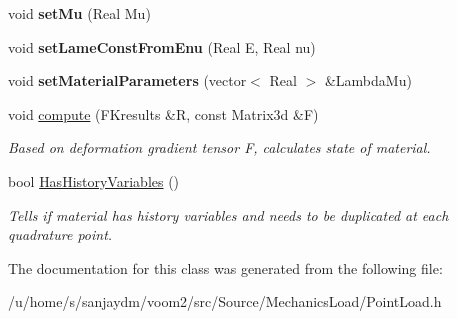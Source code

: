 \begin{DoxyCompactItemize}
\item 
\hypertarget{classvoom_1_1_point_load_a7dd8de114919a5428ed5692b149ee40a}{
void {\bfseries setMu} (Real Mu)}
\label{classvoom_1_1_point_load_a7dd8de114919a5428ed5692b149ee40a}

\item 
\hypertarget{classvoom_1_1_point_load_a85890bff5831fb2db22f6b271b8b4f1b}{
void {\bfseries setLameConstFromEnu} (Real E, Real nu)}
\label{classvoom_1_1_point_load_a85890bff5831fb2db22f6b271b8b4f1b}

\item 
\hypertarget{classvoom_1_1_point_load_a5718133ac6b9516e4050f20bf7352497}{
void {\bfseries setMaterialParameters} (vector$<$ Real $>$ \&LambdaMu)}
\label{classvoom_1_1_point_load_a5718133ac6b9516e4050f20bf7352497}

\item 
\hypertarget{classvoom_1_1_point_load_a0fc8a93dd23d399b06f4f58df3a69fe0}{
void \hyperlink{classvoom_1_1_point_load_a0fc8a93dd23d399b06f4f58df3a69fe0}{compute} (FKresults \&R, const Matrix3d \&F)}
\label{classvoom_1_1_point_load_a0fc8a93dd23d399b06f4f58df3a69fe0}

\begin{DoxyCompactList}\small\item\em Based on deformation gradient tensor F, calculates state of material. \item\end{DoxyCompactList}\item 
\hypertarget{classvoom_1_1_point_load_aec5de28848938c0e6ffcb86aaa9c6b3b}{
bool \hyperlink{classvoom_1_1_point_load_aec5de28848938c0e6ffcb86aaa9c6b3b}{HasHistoryVariables} ()}
\label{classvoom_1_1_point_load_aec5de28848938c0e6ffcb86aaa9c6b3b}

\begin{DoxyCompactList}\small\item\em Tells if material has history variables and needs to be duplicated at each quadrature point. \item\end{DoxyCompactList}\end{DoxyCompactItemize}


The documentation for this class was generated from the following file:\begin{DoxyCompactItemize}
\item 
/u/home/s/sanjaydm/voom2/src/Source/MechanicsLoad/PointLoad.h\end{DoxyCompactItemize}
